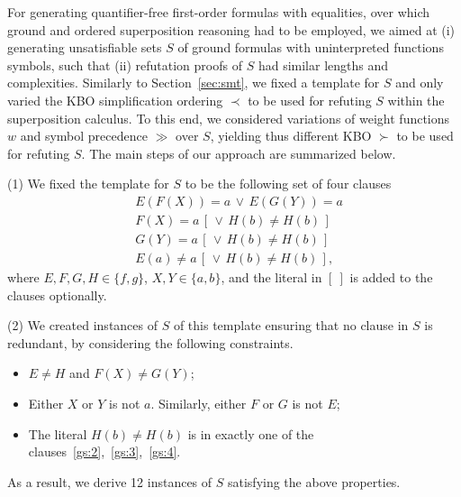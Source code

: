 For generating quantifier-free first-order formulas with equalities,
over which ground and ordered superposition reasoning had to be employed, we
aimed at (i)  generating  unsatisfiable sets $S$ of ground formulas with
uninterpreted functions symbols, such that (ii)  refutation proofs
of $S$ had similar lengths and complexities. Similarly to
Section~\ref{sec:smt}, we fixed a template for $S$  and only varied
the KBO simplification ordering $\prec$ to be used for refuting  $S$
within the superposition calculus. To this end, we considered
variations of weight functions $w$ and symbol precedence $\gg$ over $S$,
yielding thus different KBO $\succ$ to be used for refuting $S$.
The main steps of our approach are summarized below.\smallskip

\noindent(1) We fixed the template for $S$ to be the following set of four clauses
\begin{align}
  &E(F(X)) = a \,\lor\, E(G(Y)) = a \label{gs:1} \\
  &F(X) = a \,[\, \lor\, H(b) \not= H(b) \,] \label{gs:2} \\
  &G(Y) = a \,[\, \lor\, H(b) \not= H(b) \,] \label{gs:3} \\
  &E(a) \not= a \,[\, \lor\, H(b) \not= H(b) \,] \label{gs:4},
\end{align}
where $E, F, G, H \in \{f, g\}$, $X, Y \in \{a, b\}$, and the literal
in $[~]$ is added to the clauses optionally.\smallskip


\noindent(2)
We created
instances of $S$ of this template ensuring that no clause in $S$ is
redundant, by considering the following constraints.
\begin{itemize}
  \item $E \not = H$ and $F(X) \not = G(Y)$;
  \item Either $X$ or $Y$ is not $a$. Similarly, either $F$ or $G$ is not $E$;
  \item The literal $H(b) \not = H(b)$ is in exactly one of the
    clauses~\eqref{gs:2},~\eqref{gs:3},~\eqref{gs:4}.
\end{itemize}
As a result, we derive 12 instances of $S$ satisfying the above properties.\smallskip
%

